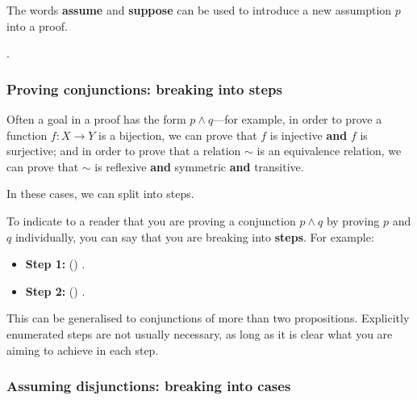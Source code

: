 \begin{vocabulary}
\label{vcbTemporaryAssumption}
The words \textbf{assume} and \textbf{suppose} can be used to introduce a new assumption $p$ into a proof.

\begin{vocabtemplate}
 . 
\end{vocabtemplate}
\end{vocabulary}

\subsubsection*{Proving conjunctions: breaking into steps}

Often a goal in a proof has the form $p \wedge q$---for example, in order to prove a function $f : X \to Y$ is a bijection, we can prove that $f$ is injective \textbf{and} $f$ is surjective; and in order to prove that a relation $\sim$ is an equivalence relation, we can prove that $\sim$ is reflexive \textbf{and} symmetric \textbf{and} transitive.

In these cases, we can split into steps.

\begin{vocabulary}
\label{vcbSteps}
To indicate to a reader that you are proving a conjunction $p \wedge q$ by proving $p$ and $q$ individually, you can say that you are breaking into \textbf{steps}. For example:

\begin{vocabtemplate}
\begin{itemize}
\item \textbf{Step 1:} () .
\item \textbf{Step 2:} () .
\end{itemize}
\end{vocabtemplate}

This can be generalised to conjunctions of more than two propositions. Explicitly enumerated steps are not usually necessary, as long as it is clear what you are aiming to achieve in each step.
\end{vocabulary}

\subsubsection*{Assuming disjunctions: breaking into cases}

